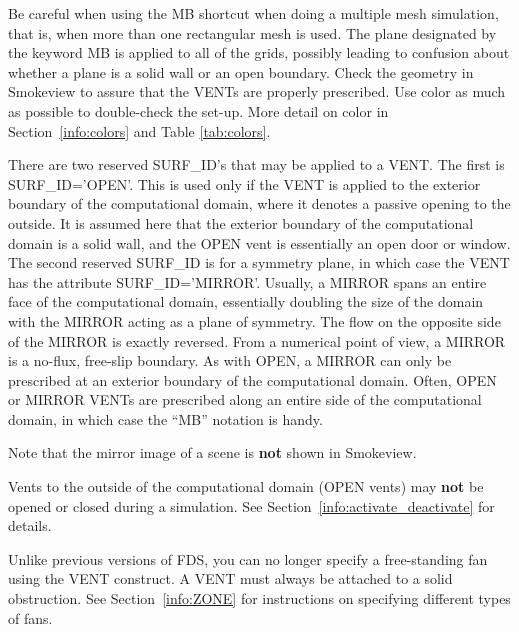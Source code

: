 \documentclass[11pt]{book}
\begin{document}
Be careful when using the {\ct MB} shortcut when doing a multiple mesh
simulation, that is, when more than one rectangular mesh is used. The
plane designated by the keyword {\ct MB} is applied to all of the
grids, possibly leading to confusion about whether a plane is a solid
wall or an open boundary. Check the geometry in Smokeview to assure that
the {\ct VENT}s are properly prescribed. Use color as much as
possible to double-check the set-up.  More detail on color in
Section~\ref{info:colors} and Table \ref{tab:colors}.

There are two reserved {\ct SURF\_ID}'s that may be applied to a {\ct VENT}.
The first is {\ct SURF\_ID='OPEN'}. This is used only if the {\ct VENT}
is applied to the exterior boundary of the computational domain, where
it denotes a passive opening to the outside. It is assumed here that
the exterior boundary of the computational domain is a solid wall, and
the {\ct OPEN} vent is essentially an open door or window.
The second reserved {\ct SURF\_ID} is for a symmetry plane, in which
case the {\ct VENT} has the attribute {\ct SURF\_ID='MIRROR'}.
Usually, a {\ct MIRROR} spans an entire face of the computational
domain, essentially doubling the size of the domain with the {\ct MIRROR}
acting as a plane of symmetry. The flow on the opposite side of the
{\ct MIRROR} is exactly reversed. From a numerical point of view,
a {\ct MIRROR} is a no-flux, free-slip boundary.
As with {\ct OPEN}, a {\ct MIRROR} can only be prescribed at an
exterior boundary of the computational domain.
Often, {\ct OPEN} or {\ct MIRROR} {\ct VENT}s are prescribed along an
entire side of the computational domain, in which case the ``{\ct MB}''
notation is handy.

\begin{warning}
\noindent
Note that the mirror image of a scene is {\bf not} shown in Smokeview.
\end{warning}

\begin{warning}
Vents to the outside of the computational domain ({\ct OPEN} vents)
may {\bf not} be opened or closed during a simulation. See Section~\ref{info:activate_deactivate} for details.
\end{warning}

\begin{warning}
Unlike previous versions of FDS, you can no longer specify a free-standing fan using the {\ct VENT}
construct. A {\ct VENT} must always be attached to a solid obstruction. See
Section~\ref{info:ZONE} for instructions on specifying different types of fans.
\end{warning}
\end{document}
